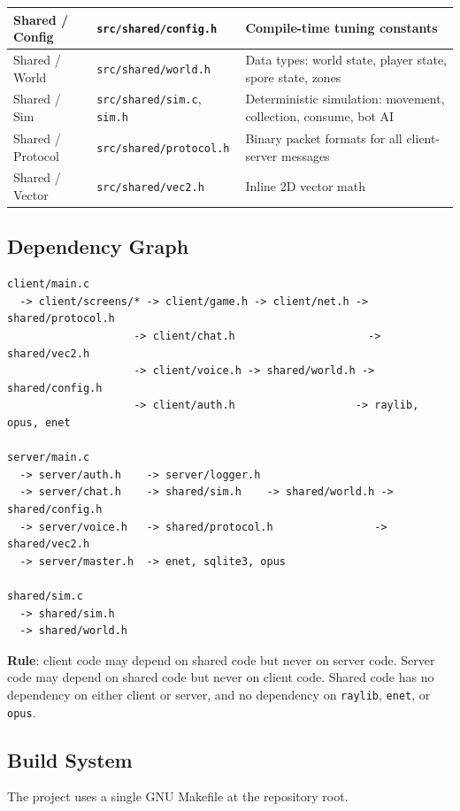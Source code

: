 \documentclass[11pt]{article}
\begin{document}
\begin{longtable}{|>{\raggedright\arraybackslash}p{}|>{\raggedright\arraybackslash}p{}|>{\raggedright\arraybackslash}p{}|}
\hline
Shared / Config & \texttt{src/shared/config.h} & Compile-time tuning constants \\
\hline
Shared / World & \texttt{src/shared/world.h} & Data types: world state, player state, spore state, zones \\
\hline
Shared / Sim & \texttt{src/shared/sim.c}, \texttt{sim.h} & Deterministic simulation: movement, collection, consume, bot AI \\
\hline
Shared / Protocol & \texttt{src/shared/protocol.h} & Binary packet formats for all client-server messages \\
\hline
Shared / Vector & \texttt{src/shared/vec2.h} & Inline 2D vector math \\
\hline
\end{longtable}

\subsection{Dependency Graph}

\begin{verbatim}
client/main.c
  -> client/screens/* -> client/game.h -> client/net.h -> shared/protocol.h
                    -> client/chat.h                     -> shared/vec2.h
                    -> client/voice.h -> shared/world.h -> shared/config.h
                    -> client/auth.h                   -> raylib, opus, enet

server/main.c
  -> server/auth.h    -> server/logger.h
  -> server/chat.h    -> shared/sim.h    -> shared/world.h -> shared/config.h
  -> server/voice.h   -> shared/protocol.h                -> shared/vec2.h
  -> server/master.h  -> enet, sqlite3, opus

shared/sim.c
  -> shared/sim.h
  -> shared/world.h
\end{verbatim}

\noindent\textbf{Rule}: client code may depend on shared code but never on server code. Server code may depend on shared code but never on client code. Shared code has no dependency on either client or server, and no dependency on \texttt{raylib}, \texttt{enet}, or \texttt{opus}.

\subsection{Build System}

The project uses a single GNU Makefile at the repository root.
\end{document}

